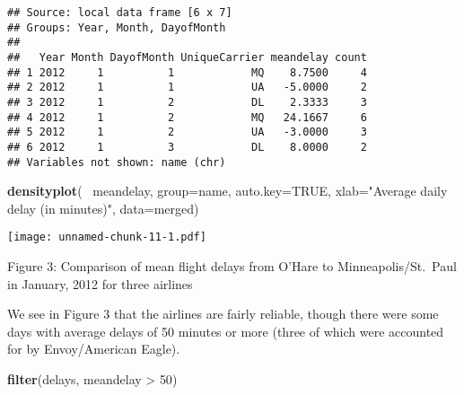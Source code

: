 \documentclass[]{article}
\newenvironment{Shaded}{\begin{snugshade}}{\end{snugshade}}
\newcommand{\KeywordTok}[1]{\textcolor[rgb]{0.13,0.29,0.53}{\textbf{{#1}}}}
\newcommand{\DataTypeTok}[1]{\textcolor[rgb]{0.13,0.29,0.53}{{#1}}}
\newcommand{\DecValTok}[1]{\textcolor[rgb]{0.00,0.00,0.81}{{#1}}}
\newcommand{\StringTok}[1]{\textcolor[rgb]{0.31,0.60,0.02}{{#1}}}
\newcommand{\OtherTok}[1]{\textcolor[rgb]{0.56,0.35,0.01}{{#1}}}
\newcommand{\NormalTok}[1]{{#1}}
\begin{document}
\begin{Shaded}
\end{Shaded}

\begin{verbatim}
## Source: local data frame [6 x 7]
## Groups: Year, Month, DayofMonth
## 
##   Year Month DayofMonth UniqueCarrier meandelay count
## 1 2012     1          1            MQ    8.7500     4
## 2 2012     1          1            UA   -5.0000     2
## 3 2012     1          2            DL    2.3333     3
## 4 2012     1          2            MQ   24.1667     6
## 5 2012     1          2            UA   -3.0000     3
## 6 2012     1          3            DL    8.0000     2
## Variables not shown: name (chr)
\end{verbatim}

\begin{Shaded}
\begin{Highlighting}[]
\KeywordTok{densityplot}\NormalTok{(~}\StringTok{ }\NormalTok{meandelay, }\DataTypeTok{group=}\NormalTok{name, }\DataTypeTok{auto.key=}\OtherTok{TRUE}\NormalTok{, }\DataTypeTok{xlab=}\StringTok{"Average daily delay (in minutes)"}\NormalTok{, }
  \DataTypeTok{data=}\NormalTok{merged)}
\end{Highlighting}
\end{Shaded}

\texttt{[image: unnamed-chunk-11-1.pdf]}

Figure 3: Comparison of mean flight delays from O'Hare to
Minneapolis/St.~Paul in January, 2012 for three airlines

We see in Figure 3 that the airlines are fairly reliable, though there
were some days with average delays of 50 minutes or more (three of which
were accounted for by Envoy/American Eagle).

\begin{Shaded}
\begin{Highlighting}[]
\KeywordTok{filter}\NormalTok{(delays, meandelay >}\StringTok{ }\DecValTok{50}\NormalTok{)}
\end{Highlighting}
\end{Shaded}
\end{document}
